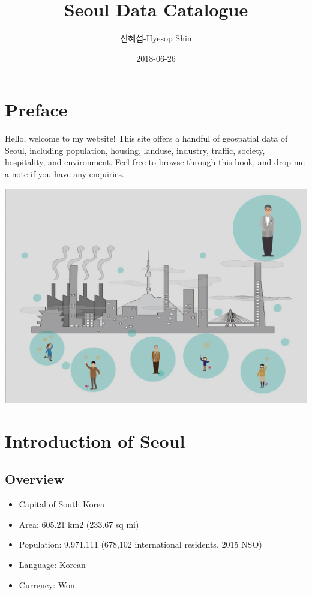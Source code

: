 \documentclass[]{book}
\title{Seoul Data Catalogue}
\author{신혜섭-Hyesop Shin}
\date{2018-06-26}
\providecommand{\tightlist}{%
  \setlength{\itemsep}{0pt}\setlength{\parskip}{0pt}}
\begin{document}
\maketitle

{
\setcounter{tocdepth}{1}
\tableofcontents
}
\chapter*{Preface}\label{preface}

Hello, welcome to my website! This site offers a handful of geospatial
data of Seoul, including population, housing, landuse, industry,
traffic, society, hospitality, and environment. Feel free to browse
through this book, and drop me a note if you have any enquiries.

\begin{center}\includegraphics[width=19.47in]{images/01_intro} \end{center}

\chapter{Introduction of Seoul}\label{introduction-of-seoul}

\section{Overview}\label{overview}

\begin{itemize}
\tightlist
\item
  Capital of South Korea
\item
  Area: 605.21 km2 (233.67 sq mi)
\item
  Population: 9,971,111 (678,102 international residents, 2015 NSO)
\item
  Language: Korean
\item
  Currency: Won
\end{itemize}
\end{document}
